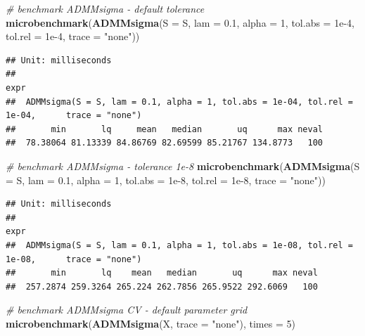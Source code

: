 \documentclass[12pt,]{book}
\newenvironment{Shaded}{\begin{snugshade}}{\end{snugshade}}
\newcommand{\CommentTok}[1]{\textcolor[rgb]{0.56,0.35,0.01}{\textit{#1}}}
\newcommand{\DataTypeTok}[1]{\textcolor[rgb]{0.13,0.29,0.53}{#1}}
\newcommand{\DecValTok}[1]{\textcolor[rgb]{0.00,0.00,0.81}{#1}}
\newcommand{\FloatTok}[1]{\textcolor[rgb]{0.00,0.00,0.81}{#1}}
\newcommand{\KeywordTok}[1]{\textcolor[rgb]{0.13,0.29,0.53}{\textbf{#1}}}
\newcommand{\NormalTok}[1]{#1}
\newcommand{\StringTok}[1]{\textcolor[rgb]{0.31,0.60,0.02}{#1}}
\theoremstyle{definition}
\theoremstyle{definition}
\theoremstyle{definition}
\theoremstyle{remark}
\begin{document}
\begin{Shaded}
\begin{Highlighting}[]
\CommentTok{# benchmark ADMMsigma - default tolerance}
\KeywordTok{microbenchmark}\NormalTok{(}\KeywordTok{ADMMsigma}\NormalTok{(}\DataTypeTok{S =}\NormalTok{ S, }\DataTypeTok{lam =} \FloatTok{0.1}\NormalTok{, }\DataTypeTok{alpha =} \DecValTok{1}\NormalTok{, }\DataTypeTok{tol.abs =} \FloatTok{1e-4}\NormalTok{, }\DataTypeTok{tol.rel =} \FloatTok{1e-4}\NormalTok{, }\DataTypeTok{trace =} \StringTok{"none"}\NormalTok{))}
\end{Highlighting}
\end{Shaded}

\begin{verbatim}
## Unit: milliseconds
##                                                                                           expr
##  ADMMsigma(S = S, lam = 0.1, alpha = 1, tol.abs = 1e-04, tol.rel = 1e-04,      trace = "none")
##       min       lq     mean   median       uq      max neval
##  78.38064 81.13339 84.86769 82.69599 85.21767 134.8773   100
\end{verbatim}

\begin{Shaded}
\begin{Highlighting}[]
\CommentTok{# benchmark ADMMsigma - tolerance 1e-8}
\KeywordTok{microbenchmark}\NormalTok{(}\KeywordTok{ADMMsigma}\NormalTok{(}\DataTypeTok{S =}\NormalTok{ S, }\DataTypeTok{lam =} \FloatTok{0.1}\NormalTok{, }\DataTypeTok{alpha =} \DecValTok{1}\NormalTok{, }\DataTypeTok{tol.abs =} \FloatTok{1e-8}\NormalTok{, }\DataTypeTok{tol.rel =} \FloatTok{1e-8}\NormalTok{, }\DataTypeTok{trace =} \StringTok{"none"}\NormalTok{))}
\end{Highlighting}
\end{Shaded}

\begin{verbatim}
## Unit: milliseconds
##                                                                                           expr
##  ADMMsigma(S = S, lam = 0.1, alpha = 1, tol.abs = 1e-08, tol.rel = 1e-08,      trace = "none")
##       min       lq    mean   median       uq      max neval
##  257.2874 259.3264 265.224 262.7856 265.9522 292.6069   100
\end{verbatim}

\begin{Shaded}
\begin{Highlighting}[]
\CommentTok{# benchmark ADMMsigma CV - default parameter grid}
\KeywordTok{microbenchmark}\NormalTok{(}\KeywordTok{ADMMsigma}\NormalTok{(X, }\DataTypeTok{trace =} \StringTok{"none"}\NormalTok{), }\DataTypeTok{times =} \DecValTok{5}\NormalTok{)}
\end{Highlighting}
\end{Shaded}
\end{document}
